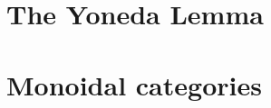 
\section{The Yoneda Lemma}
\label{sec:yoneda}


\section{Monoidal categories}
\label{sec:monoidal-cats}


% 

